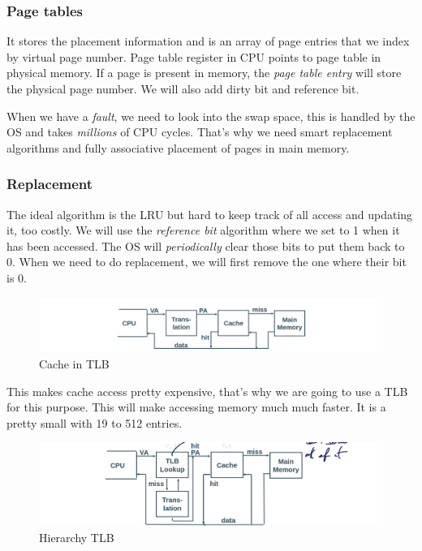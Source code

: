 \documentclass{report}
\begin{document}
\subsubsection{Page tables}

It stores the placement information and is an array of page entries that we index by virtual page number. Page table register in CPU points to page table in physical memory. If a page is present in memory, the \textit{page table entry} will store the physical page number. We will also add dirty bit and reference bit.

When we have a \textit{fault}, we need to look into the swap space, this is handled by the OS and takes \textit{millions} of CPU cycles. That's why we need smart replacement algorithms and fully associative placement of pages in main memory.

\subsubsection{Replacement}

The ideal algorithm is the LRU but hard to keep track of all access and updating it, too costly. We will use the \textit{reference bit} algorithm where we set to 1 when it has been accessed. The OS will \textit{periodically} clear those bits to put them back to 0. When we need to do replacement, we will first remove the one where their bit is 0.

\begin{figure}[H]
    \centering
    \includegraphics[width=0.95\linewidth]{cache_TLB.png}
    \caption{Cache in TLB}
    \label{fig:cache-tlb-label}
\end{figure}

This makes cache access pretty expensive,  that's why we are going to use a TLB for this purpose. This will make accessing memory much much faster. It is a pretty small with 19 to 512 entries.

\begin{figure}[H]
    \centering
    \includegraphics[width=0.95\linewidth]{TLB_hierarchy.png}
    \caption{Hierarchy TLB}
    \label{fig:hierarchy-tlb-label}
\end{figure}
\end{document}
